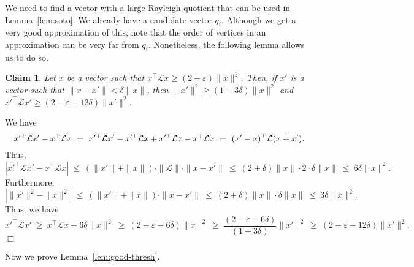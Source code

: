 \documentclass[11pt]{article}
\newtheorem{claim}[theorem]{Claim}
\newenvironment{myproof}{\noindent {\sc Proof:}}{$\Box$}
\def\epsilon{\varepsilon}
\def\lap{{\mathcal L}}
\newcommand\qi{q_i}
\begin{document}
We need to find a vector with a large Rayleigh
quotient that can be used in Lemma~\ref{lem:soto}. We already have a candidate
vector $\qi$. Although we get a very good approximation of this, note that
the order of vertices in an approximation can be very far from $\qi$.
Nonetheless, the following lemma allows us to do so.

\begin{claim} \label{clm:close}
Let $x$ be a vector such that $x^\top \lap x \geq (2 - \epsilon)\|x\|^2$. Then,
if $x'$ is a vector such that $\|x - x'\| < \delta\|x\|$, then
$\|x'\|^2 \geq (1-3\delta) \|x\|^2$ and $x'^\top \lap x' \geq (2 - \epsilon - 12\delta)\|x'\|^2$.
\end{claim}
\begin{myproof}
We have
$$x'^\top \lap x' - x^\top\lap x\ =\ x'^\top \lap x' - x'^\top \lap x + x'^\top \lap x - x^\top\lap x\\
\ =\ (x' - x)^\top \lap (x + x').$$ Thus,
$$|x'^\top \lap x' - x^\top\lap x|\ \leq\ (\|x'\| + \|x\|)\cdot \|\lap\| \cdot
\|x - x'\|\ \leq\ (2 + \delta)\|x\| \cdot 2 \cdot \delta\|x\|\ \leq\
6\delta\|x\|^2.$$ Furthermore,
$$|\|x'\|^2 - \|x\|^2|\ \leq\ (\|x'\| + \|x\|)\cdot \|x - x'\|\ \leq\ (2 + \delta)\|x\| \cdot \delta\|x\|\ \leq\
3\delta\|x\|^2.$$ Thus, we have
$$x'^\top \lap x'\ \geq\ x^\top \lap x - 6\delta \|x\|^2\ \geq\ (2-\epsilon -
6\delta)\|x\|^2\ \geq\ \frac{(2-\epsilon-6\delta)}{(1+3\delta)}\|x'\|^2\ \geq\ (2 - \epsilon - 12\delta)\|x'\|^2.$$
\end{myproof}


Now we prove Lemma~\ref{lem:good-thresh}.
\end{document}
